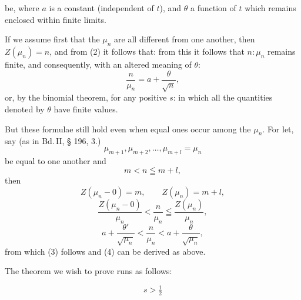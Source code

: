 be, where $a$ is a constant (independent of $t$), and $\theta$ a function of $t$ which remains enclosed within finite limits.

If we assume first that the $\mu_n$ are all different from one another, then $Z(\mu_n) = n$, and from (2) it follows that:
from this it follows that $n:\mu_n$ remains finite, and consequently, with an altered meaning of $\theta$:
\[
\frac{n}{\mu_n} = a + \frac{\theta}{\sqrt{n}},
\]
or, by the binomial theorem, for any positive $s$:
in which all the quantities denoted by $\theta$ have finite values.

But these formulae still hold even when equal ones occur among the $\mu_n$. For let, say (as in Bd.\,II, § 196, 3.)
\[
\mu_{m+1}, \mu_{m+2}, \ldots, \mu_{m+l} = \mu_n
\]
be equal to one another and
\[
m < n \leqq m+l,
\]
then
\[
Z(\mu_n-0) = m, \qquad Z(\mu_n) = m+l,
\]
\[
\frac{Z(\mu_n-0)}{\mu_n} < \frac{n}{\mu_n} \leqq \frac{Z(\mu_n)}{\mu_n},
\]
\[
a + \frac{\theta'}{\sqrt{\mu_n}} < \frac{n}{\mu_n} < a + \frac{\theta}{\sqrt{\mu_n}},
\]
from which (3) follows and (4) can be derived as above.

The theorem we wish to prove runs as follows:


\[
s > \tfrac{1}{2}
\]
